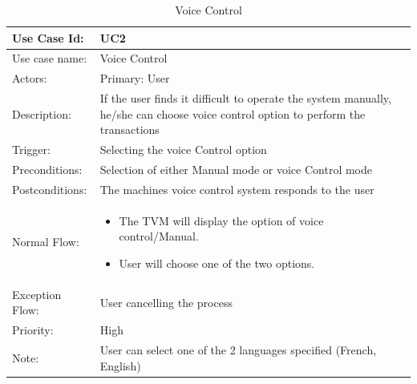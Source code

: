 \documentclass[11pt,oneside]{book}
\begin{document}
\begin{table}[h]
\centering
\begin{tabular}{|p{2.4cm}|p{11cm}|}
\hline
{Use Case Id: } & {UC2} \\
\hline
{Use case name:} & {Voice Control}\\
\hline
{Actors: } & {Primary: User}\\
\hline
{Description:} & { If the user finds it difficult to operate the system manually, he/she can choose voice control option to perform the transactions }\\
\hline
{Trigger:  } & {Selecting the voice Control option}\\
\hline
{Preconditions:  } & {Selection of either Manual mode or voice Control mode}\\
\hline
{Postconditions:} & {The machines voice control system responds to the user}\\
\hline
{Normal Flow: } & {
\begin{itemize}
\item	The TVM will display the option of voice control/Manual.
\item	User will choose one of the two options.
 
\end{itemize}
}\\
\hline
{Exception Flow: } & {User cancelling the process}\\
\hline
{Priority:  } & {High}\\
\hline
{Note:  } & {User can select one of the 2 languages specified (French, English)}\\
\hline
\end{tabular}
\caption{Voice Control}
\end{table}
\end{document}
